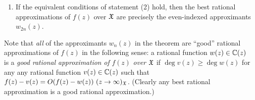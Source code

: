\documentclass[12pt]{article}
\begin{document}
\begin{theorem}
\begin{enumerate}
\begin{enumerate}
\item $f(z) - w_n(z) = O\left(\frac{1}{z^{n+1}} \right) \ (z \to \infty)_\XX$ for all nonnegative integers $n$.
\item $f(z) - w_n(z) = O\left(\frac{1}{z^{n+1}} \right) \ (z \to \infty)_\XX$ for infinitely many  nonnegative integers $n$.
\item $w_{2n}(z)$ for every nonnegative integer $n$ is the unique rational function  $w(z) \in \CC(z)$ of degree at most $n$ such that $f(z) - w(z) = O\left(\frac{1}{z^{2n+1}} \right) \ (z \to \infty)_\XX$.
\item $w_{2n}(z)$ for every positive integer $n$ is the unique Pad\'e approximant of $f(z)$ over $\XX$  at $z = \infty$ of order $[n-1,n]$. 
\end{enumerate}
\item If the equivalent conditions of statement (2) hold, then the best rational approximations of $f(z)$ over $\XX$ are precisely the even-indexed approximants $w_{2n}(z)$. 
\end{enumerate}
\end{theorem}



Note that {\it all} of the approximants $w_n(z)$ in the theorem are ``good'' rational approximations of $f(z)$  in the following sense: a rational  function $w(z) \in \CC(z)$ is a {\it good rational approximation of $f(z)$ over $\XX$} if $\deg v(z) \geq \deg w(z)$ for any any rational function $v(z) \in {\mathbb C}(z)$ such that $f(z)-v(z) = O(f(z)-w(z)) \ (z \to \infty)_{\mathfrak X}$.  (Clearly any best rational approximation is a good rational approximation.)





\end{document}
